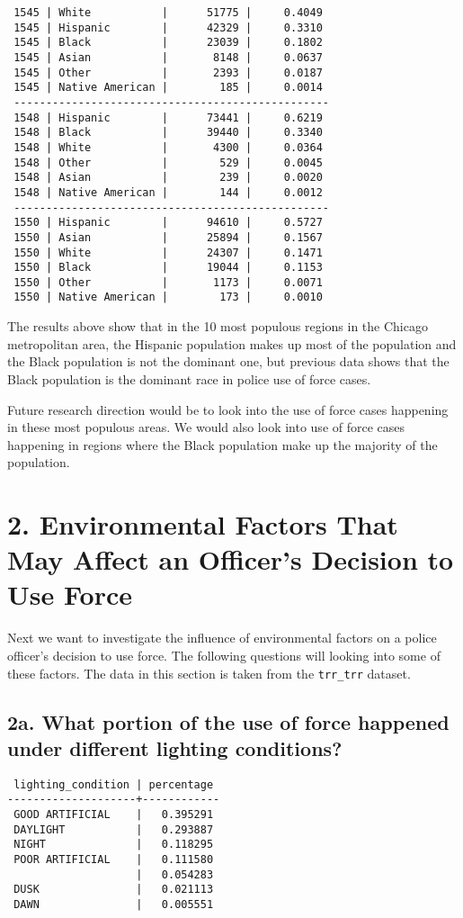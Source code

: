 \documentclass[10pt]{article}
\begin{document}
\begin{verbatim}
 1545 | White           |      51775 |     0.4049
 1545 | Hispanic        |      42329 |     0.3310
 1545 | Black           |      23039 |     0.1802
 1545 | Asian           |       8148 |     0.0637
 1545 | Other           |       2393 |     0.0187
 1545 | Native American |        185 |     0.0014
 -------------------------------------------------
 1548 | Hispanic        |      73441 |     0.6219
 1548 | Black           |      39440 |     0.3340
 1548 | White           |       4300 |     0.0364
 1548 | Other           |        529 |     0.0045
 1548 | Asian           |        239 |     0.0020
 1548 | Native American |        144 |     0.0012
 -------------------------------------------------
 1550 | Hispanic        |      94610 |     0.5727
 1550 | Asian           |      25894 |     0.1567
 1550 | White           |      24307 |     0.1471
 1550 | Black           |      19044 |     0.1153
 1550 | Other           |       1173 |     0.0071
 1550 | Native American |        173 |     0.0010
\end{verbatim}

The results above show that in the 10 most populous regions in the Chicago metropolitan area, the Hispanic population makes up most of the population and the Black population is not the dominant one, but previous data shows that the Black population is the dominant race in police use of force cases.

Future research direction would be to look into the use of force cases happening in these most populous areas. We would also look into use of force cases happening in regions where the Black population make up the majority of the population.


\section*{2. Environmental Factors That May Affect an Officer’s Decision to Use Force}

Next we want to investigate the influence of environmental factors on a police officer's decision to use force. The following questions will looking into some of these factors. The data in this section is taken from the \texttt{trr\_trr} dataset.


\subsection*{2a. What portion of the use of force happened under different lighting conditions?}

\begin{verbatim}
 lighting_condition | percentage
--------------------+------------
 GOOD ARTIFICIAL    |   0.395291
 DAYLIGHT           |   0.293887
 NIGHT              |   0.118295
 POOR ARTIFICIAL    |   0.111580
                    |   0.054283
 DUSK               |   0.021113
 DAWN               |   0.005551
\end{verbatim}
\end{document}
